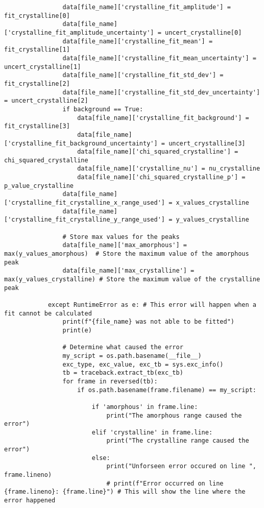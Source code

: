 \begin{lstlisting}
                data[file_name]['crystalline_fit_amplitude'] = fit_crystalline[0]
                data[file_name]['crystalline_fit_amplitude_uncertainty'] = uncert_crystalline[0]
                data[file_name]['crystalline_fit_mean'] = fit_crystalline[1]
                data[file_name]['crystalline_fit_mean_uncertainty'] = uncert_crystalline[1]
                data[file_name]['crystalline_fit_std_dev'] = fit_crystalline[2]
                data[file_name]['crystalline_fit_std_dev_uncertainty'] = uncert_crystalline[2]
                if background == True:
                    data[file_name]['crystalline_fit_background'] = fit_crystalline[3]
                    data[file_name]['crystalline_fit_background_uncertainty'] = uncert_crystalline[3]
                    data[file_name]['chi_squared_crystalline'] = chi_squared_crystalline
                    data[file_name]['crystalline_nu'] = nu_crystalline
                    data[file_name]['chi_squared_crystalline_p'] = p_value_crystalline
                data[file_name]['crystalline_fit_crystalline_x_range_used'] = x_values_crystalline
                data[file_name]['crystalline_fit_crystalline_y_range_used'] = y_values_crystalline

                # Store max values for the peaks
                data[file_name]['max_amorphous'] = max(y_values_amorphous)  # Store the maximum value of the amorphous peak
                data[file_name]['max_crystalline'] = max(y_values_crystalline) # Store the maximum value of the crystalline peak

            except RuntimeError as e: # This error will happen when a fit cannot be calculated
                print(f"{file_name} was not able to be fitted")
                print(e)

                # Determine what caused the error
                my_script = os.path.basename(__file__)
                exc_type, exc_value, exc_tb = sys.exc_info()
                tb = traceback.extract_tb(exc_tb)
                for frame in reversed(tb):
                    if os.path.basename(frame.filename) == my_script:

                        if 'amorphous' in frame.line: 
                            print("The amorphous range caused the error")
                        elif 'crystalline' in frame.line:
                            print("The crystalline range caused the error")
                        else:
                            print("Unforseen error occured on line ", frame.lineno)
                            # print(f"Error occurred on line {frame.lineno}: {frame.line}") # This will show the line where the error happened


\end{lstlisting}
